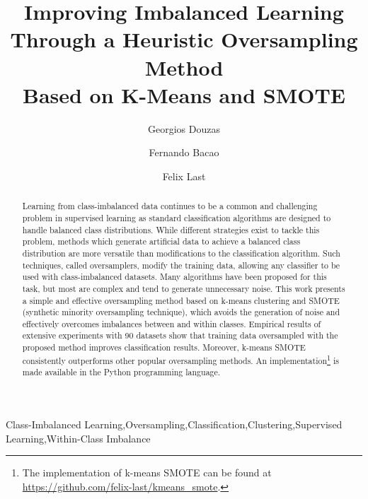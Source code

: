 \documentclass[sort&compress]{elsarticle}
\begin{document}
\begin{frontmatter}

\title{Improving Imbalanced Learning \\Through a Heuristic Oversampling Method \\Based on K-Means and SMOTE}

\author[nova]{Georgios Douzas}
\author[nova]{Fernando Bacao}
\author[nova]{Felix Last}
\address[nova]{Nova Information Management School, Campus de Campolide, 1070-312 Lisboa, Portugal \\ Telephone: +351 21 382 8610}

\begin{abstract}
Learning from class-imbalanced data continues to be a common and challenging
problem in supervised learning as standard classification algorithms are
designed to handle balanced class distributions. While different strategies
exist to tackle this problem, methods which generate artificial data to achieve
a balanced class distribution are more versatile than modifications to the
classification algorithm. Such techniques, called oversamplers, modify the
training data, allowing any classifier to be used with class-imbalanced
datasets. Many algorithms have been proposed for this task, but most are complex
and tend to generate unnecessary noise. This work presents a simple and
effective oversampling method based on k-means clustering and SMOTE (synthetic
minority oversampling technique), which avoids the generation of noise and
effectively overcomes imbalances between and within classes. Empirical results
of extensive experiments with 90 datasets show that training data oversampled
with the proposed method improves classification results. Moreover, k-means
SMOTE consistently outperforms other popular oversampling methods. An
implementation\footnote{The implementation of k-means \acs{SMOTE} can be found
at \url{https://github.com/felix-last/kmeans_smote}.} is made available in the
Python programming language.
\end{abstract}

\begin{keyword}
Class-Imbalanced Learning\sep Oversampling\sep Classification\sep Clustering\sep Supervised Learning\sep Within-Class Imbalance
\end{keyword}

\end{frontmatter}
\end{document}
